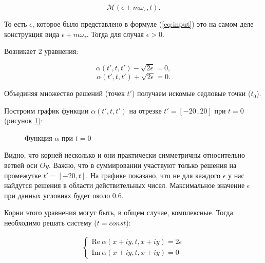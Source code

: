 \documentclass[14pt, a4paper]{article}
\numberwithin{figure}{section}
\numberwithin{equation}{section}
\renewcommand{\Re}{\mathrm{Re}}
\renewcommand{\Im}{\mathrm{Im}}
\newcommand{\cM}{\mathcal{M}}
\begin{document}
$$
\cM(\epsilon+m\omega_\tau,t).
$$

То есть $\epsilon$, которое было представлено в формуле (\ref{eq:input}) это на самом деле конструкция вида $\epsilon+m\omega_\tau$. Тогда для случая $\epsilon > 0$.

Возникает 2 уравнения:

$$\alpha(t', t, t') - \sqrt{2\epsilon} = 0,$$
$$\alpha(t', t, t') + \sqrt{2\epsilon} = 0.$$

Объединяя множество решений (точек $t'$) получаем искомые седловые точки ($t_0$).

Построим график функции $\alpha(t', t, t')$ на отрезке $t' = [-20..20]$ при $t = 0$ (рисунок \ref{ris:alpha-20..0}):

\begin{figure}[h]
	\caption{Функция $\alpha$ при $t = 0$}
	\label{ris:alpha-20..0}
\end{figure}

Видно, что корней несколько и они практически симметричны относительно ветвей оси $O y$. Важно, что в суммировании участвуют только решения на промежутке $t' = [-20, t]$. 
На графике показано, что не для каждого $\epsilon$ у нас найдутся решения в области действительных чисел. Максимальное значение $\epsilon$ при данных условиях будет около 0.6.

Корни этого уравнения могут быть, в общем случае, комплексные. Тогда необходимо решать систему ($t = const$):

\begin{eqnarray}
\begin{cases}
\Re \ \alpha(x+i y, t, x+i y) = 2\epsilon \nonumber\\
\Im \ \alpha(x+i y, t, x+i y) = 0 \nonumber
\end{cases}
\end{eqnarray}
\end{document}
